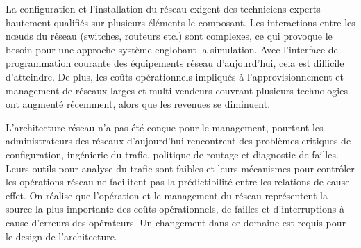 La configuration et l'installation du réseau exigent des techniciens experts hautement qualifiés sur plusieurs éléments le composant. Les interactions entre les nœuds du réseau (switches, routeurs etc.) sont complexes, ce qui provoque le besoin pour une approche système englobant la simulation. Avec l'interface de programmation courante des équipements réseau d'aujourd'hui, cela est difficile d'atteindre. De plus, les coûts opérationnels impliqués à l'approvisionnement et management de réseaux larges et multi-vendeurs  couvrant plusieurs technologies ont augmenté récemment, alors que les revenues se diminuent. \cite{ImplementationChallengesForSDN}







L'architecture réseau n'a pas été conçue pour le management, pourtant les administrateurs des réseaux d'aujourd'hui rencontrent des problèmes critiques de configuration, ingénierie du trafic, politique de routage et diagnostic de failles. Leurs outils pour analyse du trafic sont faibles et leurs mécanismes pour contrôler les opérations réseau ne facilitent pas la prédictibilité entre les relations de cause-effet. On réalise que l'opération et le management du réseau représentent la source la plus importante des coûts opérationnels, de failles et d'interruptions à cause d'erreurs des opérateurs. Un changement dans ce domaine est requis pour le design de l'architecture. \cite{NGSIManagement}


\clearpage




